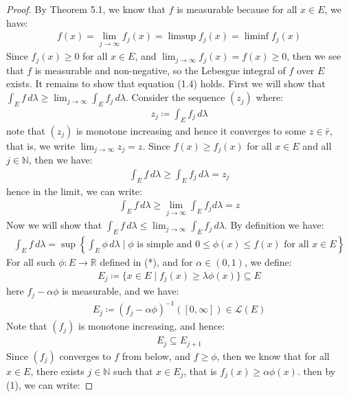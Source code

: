 \documentclass[11pt]{book}
\theoremstyle{break}
\theoremstyle{break}
\newcommand{\R}{\mathbb{R}}
\newcommand{\N}{\mathbb{N}}
\begin{document}
\begin{proof}
By Theorem 5.1, we know that $f$ is measurable because for all $x \in E$, we have:
\begin{align*}
f(x)=\lim_{j\to \infty}f_j(x) = \limsup f_j(x) = \liminf f_j(x)
\end{align*}
Since $f_j(x) \geq 0$ for all $x \in E$, and $\lim_{j\to \infty}f_j(x) = f(x) \geq 0$, then we see that $f$ is measurable and non-negative, so the Lebesgue integral of $f$ over $E$ exists. It remains to show that equation (1.4) holds. First we will show that $\int_E f\, d\lambda \geq \lim_{j\to \infty} \int_E f_j \, d\lambda$. Consider the sequence $(z_j)$ where:
\begin{align*}
z_j \coloneqq \int_E f_j \, d\lambda
\end{align*}
note that $(z_j)$ is monotone increasing and hence it converges to some $z \in \bar{r}$, that is, we write $\lim_{j\to \infty }z_j =z$. Since $f(x) \geq f_j(x)$ for all $x \in E$ and all $j \in \N$, then we have:
\begin{align*}
\int_E f\, d\lambda \geq \int_E f_j \, d\lambda = z_j
\end{align*}
hence in the limit, we can write:
\begin{align*}
\int_E f\, d\lambda \geq \lim_{j\to \infty}\int_E f_j d\lambda = z
\end{align*}
Now we will show that $\int_E f\, d\lambda \leq \lim_{j\to \infty}\int_E f_j \, d\lambda$. By definition we have:
\begin{align*}
\int_E f\, d\lambda = \sup\left\{ \int_E \phi \, d\lambda \mid \phi \text{ is simple and }0\leq \phi(x) \leq f(x) \text{ for all }x\in E\right\} \tag{*}
\end{align*}
For all such $\phi:E \to \R$ defined in (*), and for $\alpha \in (0,1)$, we define:
\begin{align*}
E_j \coloneqq \{ x \in E \mid f_j (x) \geq \lambda \phi(x) \} \subseteq E \tag{i}
\end{align*}
here $f_j -\alpha \phi$ is measurable, and we have:
\begin{align*}
E_j \coloneqq (f_j - \alpha \phi)^{-1}([0,\infty]) \in \mathcal{L}(E)\tag{ii}
\end{align*}
Note that $(f_j)$ is monotone increasing, and hence: 
\begin{align*}
E_j \subseteq E_{j+1}
\tag{iii}
\end{align*}
Since $(f_j)$ converges to $f$ from below, and $f\geq \phi$, then we know that for all $x \in E$, there exists $j\in \N$ such that $x \in E_j$, that is $f_j(x) \geq \alpha \phi(x)$. then by (1), we can write:

\end{proof}
\end{document}
